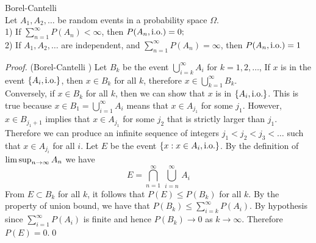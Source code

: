 \begin{lemma}{Borel-Cantelli}\\

Let $A_1, A_2, \hdots $ be random events in a probability space $\Omega$.\\

1) If $\sum_{n=1}^\infty P(A_n) < \infty$, then $P(A_n, \hbox{i.o.}) = 0;$\\

2) If $A_1, A_2, \hdots$ are independent, and $\sum_{n=1}^\infty P(A_n) = \infty$, then $P(A_n, \hbox{i.o.}) = 1$\\

\end{lemma}

\begin{proof}{(Borel-Cantelli {})}
Let $B_k$ be the event $\bigcup\limits_{i=k}^\infty A_i$ for $k=1,2,\hdots$, If $x$ is in the event $\{ A_i, \hbox{i.o.} \}$, then $x\in B_k$ for all $k$, therefore $x\in \bigcup\limits_{k=1}^\infty B_k$.\\

Conversely, if $x\in B_k$ for all $k$, then we can show that $x$ is in $\{A_i, \hbox{i.o.}\}$. This is true because $x\in B_1 = \bigcup\limits_{i=1}^\infty A_i$ means that $x\in A_{j_1}$ for some $j_1$. However, 
$x\in B_{j_1 + 1}$ implies that $x\in A_{j_1}$ for some $j_2$ that is strictly larger than $j_1$. Therefore we can produce an infinite sequence of integers $j_1 < j_2 < j_3 < \hdots$ such that $x\in A_{j_i}$ for 
all $i$. Let $E$ be the event $\{ x: x\in A_i, \hbox{i.o.} \}$. By the definition of $\limsup_{n\rightarrow\infty} A_n$ we have 
$$E = \bigcap\limits_{n=1}^\infty \, \bigcup\limits_{i=n}^\infty \, A_i $$ From $E\subset B_k$ for all $k$, it follows that $P(E) \le P(B_k)$ for all $k$. By the property of union bound, we have that $P(B_k) \le \sum_{i=k}^\infty P(A_i)$. By hypothesis since $\sum_{i=1}^\infty P(A_i)$ is finite and hence $P(B_k)\rightarrow 0$ as $k\rightarrow\infty$. Therefore $P(E) = 0$.\qed
\end{proof}

